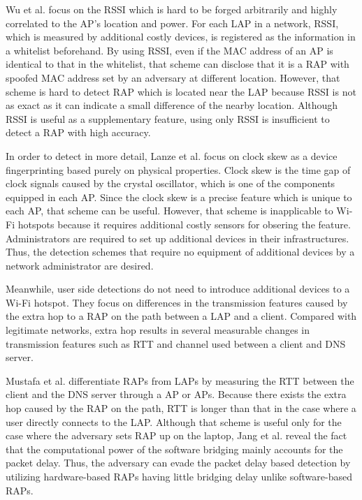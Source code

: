 \documentclass[conference]{IEEEtran}
\begin{document}
Wu et al. \cite{prapd} focus on the RSSI which is hard to be forged arbitrarily and highly correlated to the AP's location and power.
For each LAP in a network, RSSI, which is measured by additional costly devices, is registered as the information in a whitelist beforehand.
By using RSSI, even if the MAC address of an AP is identical to that in the whitelist, that scheme can disclose that it is a RAP with spoofed MAC address set by an adversary at different location.
However, that scheme is hard to detect RAP which is located near the LAP because RSSI is not as exact as it can indicate a small difference of the nearby location.
Although RSSI is useful as a supplementary feature, using only RSSI is insufficient to detect a RAP with high accuracy.

In order to detect in more detail, Lanze et al. \cite{clockskew} focus on clock skew as a device fingerprinting based purely on physical properties.
Clock skew is the time gap of clock signals caused by the crystal oscillator, which is one of the components equipped in each AP.
Since the clock skew is a precise feature which is unique to each AP, that scheme can be useful.
However, that scheme is inapplicable to Wi-Fi hotspots because it requires additional costly sensors for obsering the feature.
Administrators are required to set up additional devices in their infrastructures.
Thus, the detection schemes that require no equipment of additional devices by a network administrator are desired.

Meanwhile, user side detections \cite{rtt}\cite{previous} do not need to introduce additional devices to a Wi-Fi hotspot.
They focus on differences in the transmission features caused by the extra hop to a RAP on the path between a LAP and a client.
Compared with legitimate networks, extra hop results in several measurable changes in transmission features such as RTT and channel used between a client and DNS server.

Mustafa et al. \cite{rtt} differentiate RAPs from LAPs by measuring the RTT between the client and the DNS server through a AP or APs.
Because there exists the extra hop caused by the RAP on the path, RTT is longer than that in the case where a user directly connects to the LAP.
Although that scheme is useful only for the case where the adversary sets RAP up on the laptop, Jang et al. \cite{previous} reveal the fact that the computational power of the software bridging mainly accounts for the packet delay.
Thus, the adversary can evade the packet delay based detection by utilizing hardware-based RAPs having little bridging delay unlike software-based RAPs.
\end{document}
